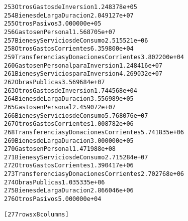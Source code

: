 \documentclass[letterpaper,10pt,english]{/usr/local/lib/python2.7/dist-packages/sphinx/texinputs/sphinxhowto}
\newenvironment{InvisibleVerbatim}
        {\begin{mdframed}[leftmargin=0.1\linewidth,innerleftmargin=3pt,innerrightmargin=3pt, userdefinedwidth=1\linewidth, linewidth=0pt, linecolor=white, usetwoside=false]}
        {\end{mdframed}}
\begin{document}
\begin{InvisibleVerbatim}
\begin{alltt}
253                          Otros Gastos de Inversion  1.248378e+05
254                          Bienes de Larga Duracion   2.049127e+07
255                                      Otros Pasivos  3.000000e+05
256                                 Gastos en Personal  1.568705e+07
257                      Bienes y Servicios de Consumo  2.515521e+06
258                            Otros Gastos Corrientes  6.359800e+04
259             Transferencias y Donaciones Corrientes  3.802200e+04
260                  Gastos en Personal para Inversion  1.248416e+07
261                  Bienes y Servicios para Inversion  4.269032e+07
262                                     Obras Publicas  3.569684e+07
263                          Otros Gastos de Inversion  1.744568e+04
264                          Bienes de Larga Duracion   3.556989e+05
265                                 Gastos en Personal  2.459072e+07
266                      Bienes y Servicios de Consumo  5.768076e+07
267                            Otros Gastos Corrientes  1.008782e+06
268             Transferencias y Donaciones Corrientes  5.741835e+06
269                          Bienes de Larga Duracion   3.000000e+05
270                                 Gastos en Personal  1.471988e+08
271                      Bienes y Servicios de Consumo  2.715284e+07
272                            Otros Gastos Corrientes  1.390417e+06
273             Transferencias y Donaciones Corrientes  2.702768e+06
274                                     Obras Publicas  1.035335e+06
275                          Bienes de Larga Duracion   2.866046e+06
276                                      Otros Pasivos  5.000000e+04

[277 rows x 8 columns]\end{alltt}

            \end{InvisibleVerbatim}
            
        
    


\end{document}
